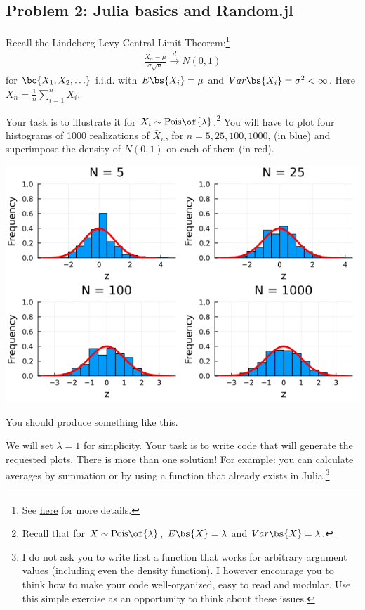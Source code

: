 \documentclass[english,hyperref={pdftex,pdfpagemode=UseNone,hidelinks}]{tufte-handout}
\begin{document}
\subsection*{Problem 2: Julia basics and Random.jl}

Recall the Lindeberg-Levy Central Limit Theorem:\footnote{See \href{https://en.wikipedia.org/wiki/Central_limit_theorem}{here} for more details.} 
\begin{align*}
    \frac{\bar X_n - \mu}{\sigma\sqrt{n}} \xrightarrow{d} N(0, 1)
\end{align*}
for $\bc{X_1,X_2,\ldots}$ i.i.d. with $E\bs{X_i} = \mu$ and $Var\bs{X_i} = \sigma^2<\infty$. Here $\bar X_n = \frac{1}{n}\sum_{i=1}^n X_i$.

Your task is to illustrate it for $X_i \sim \text{Pois}\of{\lambda}$.\footnote{Recall that for $X \sim \text{Pois}\of{\lambda}$, $E\bs{X} = \lambda$ and $Var\bs{X} = \lambda$.} 
You will have to plot four histograms of 1000 realizations of $\bar X_n$, for $n = 5, 25, 100, 1000$, (in blue) and superimpose the density of $N(0,1)$ on each of them (in red). \begin{marginfigure}
    \includegraphics[width=1\textwidth]{clt.png}
    \caption{You should produce something like this.}
\end{marginfigure}

We will set $\lambda = 1$ for simplicity. Your task is to write code that will generate the requested plots. There is more than one solution! For example: you can calculate averages by summation or by using a function that already exists in Julia.\footnote{I do not ask you to write first a function that works for arbitrary argument values (including even the density function). I however encourage you to think how to make your code well-organized, easy to read and modular. Use this simple exercise as an opportunity to think about these issues. } 
\end{document}
